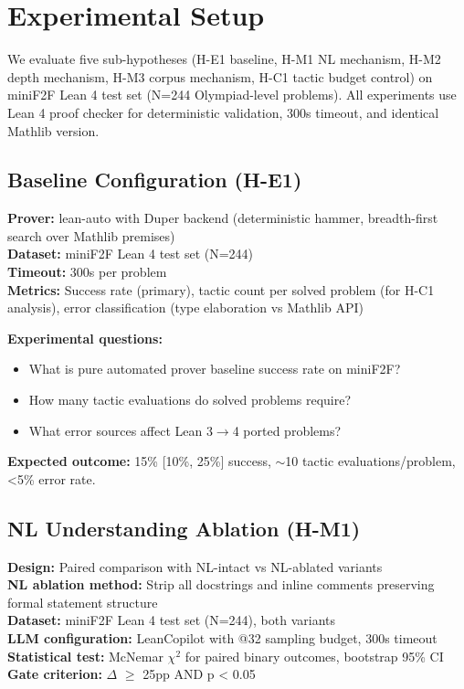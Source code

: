 \section{Experimental Setup}

We evaluate five sub-hypotheses (H-E1 baseline, H-M1 NL mechanism, H-M2 depth mechanism, H-M3 corpus mechanism, H-C1 tactic budget control) on miniF2F Lean 4 test set (N=244 Olympiad-level problems). All experiments use Lean 4 proof checker for deterministic validation, 300s timeout, and identical Mathlib version.

\subsection{Baseline Configuration (H-E1)}

\textbf{Prover:} lean-auto with Duper backend (deterministic hammer, breadth-first search over Mathlib premises) \\
\textbf{Dataset:} miniF2F Lean 4 test set (N=244) \\
\textbf{Timeout:} 300s per problem \\
\textbf{Metrics:} Success rate (primary), tactic count per solved problem (for H-C1 analysis), error classification (type elaboration vs Mathlib API)

\textbf{Experimental questions:}
\begin{itemize}
\item What is pure automated prover baseline success rate on miniF2F?
\item How many tactic evaluations do solved problems require?
\item What error sources affect Lean 3$\rightarrow$4 ported problems?
\end{itemize}

\textbf{Expected outcome:} 15\% [10\%, 25\%] success, $\sim$10 tactic evaluations/problem, <5\% error rate.

\subsection{NL Understanding Ablation (H-M1)}

\textbf{Design:} Paired comparison with NL-intact vs NL-ablated variants \\
\textbf{NL ablation method:} Strip all docstrings and inline comments preserving formal statement structure \\
\textbf{Dataset:} miniF2F Lean 4 test set (N=244), both variants \\
\textbf{LLM configuration:} LeanCopilot with @32 sampling budget, 300s timeout \\
\textbf{Statistical test:} McNemar $\chi^2$ for paired binary outcomes, bootstrap 95\% CI \\
\textbf{Gate criterion:} $\Delta$ $\geq$ 25pp AND p < 0.05


